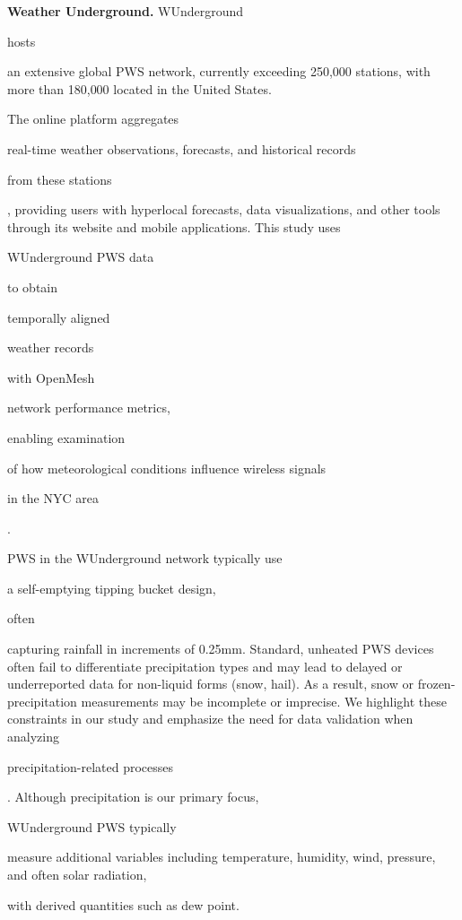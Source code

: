 \documentclass[manuscript]{copernicus}
\newif\ifshowrevisions
\newcommand{\blue}[1]{%
  \ifshowrevisions
    \textcolor{black}{#1}%
  \else
    #1%
  \fi
}
\begin{document}
\noindent \textbf{Weather Underground.}
WUnderground \citep{wunderground} \blue{hosts} an extensive global PWS network, currently exceeding 250{,}000 stations, with more than 180{,}000 located in the United States. \blue{The online platform aggregates} real-time weather observations, forecasts, and historical records \blue{from these stations}, providing users with hyperlocal forecasts, data visualizations, and other tools through its website and mobile applications.
This study uses \blue{WUnderground PWS data} to obtain \blue{temporally aligned} weather records \blue{with OpenMesh} network performance metrics, \blue{enabling examination} of how meteorological conditions influence wireless signals \blue{in the NYC area}.
\blue{PWS in the WUnderground network typically use} a self-emptying tipping bucket design, \blue{often} capturing rainfall in increments of 0.25mm. Standard, unheated PWS devices often fail to differentiate precipitation types and may lead to delayed or underreported data for non-liquid forms (snow, hail). As a result, snow or frozen-precipitation measurements may be incomplete or imprecise. We highlight these constraints in our study and emphasize the need for data validation when analyzing \blue{precipitation-related processes}.
Although precipitation is our primary focus, \blue{WUnderground PWS typically} measure additional variables including temperature, humidity, wind, pressure, and often solar radiation, \blue{with derived quantities such as dew point.} 







\end{document}
